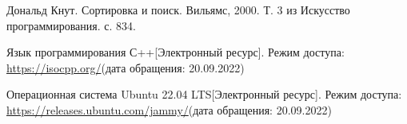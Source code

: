 
\begin{thebibliography}{10}
	Дональд Кнут. Сортировка и поиск. Вильямс, 2000. Т. 3 из Искусство программирования. с. 834.
	
	Язык программирования С++[Электронный ресурс]. Режим доступа: 
	\url{https://isocpp.org/}(дата обращения: 20.09.2022)
	
	Операционная система Ubuntu 22.04 LTS[Электронный ресурс]. Режим доступа: 
	\url{https://releases.ubuntu.com/jammy/}(дата обращения: 20.09.2022)
	
	
\end{thebibliography}





